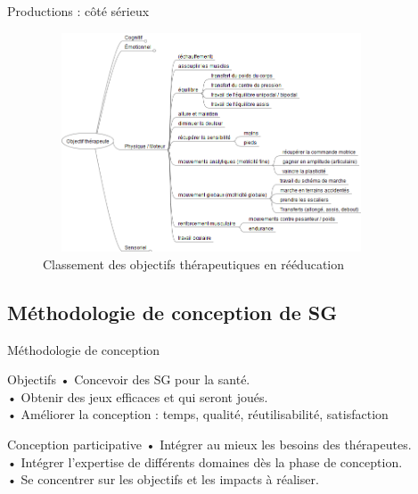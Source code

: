 \documentclass{beamer}
\begin{document}
		\begin{frame}{Productions : côté sérieux}
			\begin{figure}
			\includegraphics[width=10cm, height=6.5cm]{../images/objectifs_moteurs.png}
			\caption{Classement des objectifs thérapeutiques en rééducation}
			\end{figure}
		\end{frame}
			
		\subsection{Méthodologie de conception de SG}
		\begin{frame}{Méthodologie de conception}
			\begin{exampleblock}{Objectifs}
				• Concevoir des SG pour la santé.\\ \pause
				• Obtenir des jeux efficaces et qui seront joués.\\ \pause
				• Améliorer la conception : temps, qualité, réutilisabilité, satisfaction 
			\end{exampleblock} \pause
			\begin{alertblock}{Conception participative}
				• Intégrer au mieux les besoins des thérapeutes.\\
				• Intégrer l'expertise de différents domaines dès la phase de conception.\\
				• Se concentrer sur les objectifs et les impacts à réaliser.
			\end{alertblock}
		\end{frame}			
		
\end{document}
